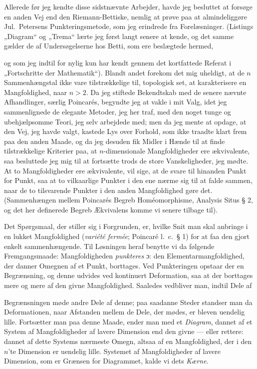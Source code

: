 \documentclass{article}
\begin{document}
Allerede før jeg kendte disse sidstnævnte Arbejder, havde jeg besluttet at forsøge en anden Vej end den Riemann-Bettiske, nemlig at prøve paa at almindeliggøre Jul.~Petersens Punkteringsmetode, som jeg erindrede fra Forelæsninger. (Listings „Diagram“ og „Trema“ lærte jeg først langt senere at kende, og det samme gælder de af Undersøgelserne hos Betti, som ere beslægtede hermed,

og som jeg indtil for nylig kun har kendt gennem det kortfattede Referat i „Fortschritte der Mathematik“). Blandt andet forekom det mig uheldigt, at de $n$ Sammenhængstal ikke vare tilstrækkelige til, topologisk set, at karakterisere en Mangfoldighed, naar $n > 2$. Da jeg stiftede Bekendtskab med de senere nævnte Afhandlinger, særlig Poincarés, begyndte jeg at vakle i mit Valg, idet jeg sammenlignede de elegante Metoder, jeg her traf, med den noget tunge og ubehjælpsomme Teori, jeg selv arbejdede med; men da jeg mente at opdage, at den Vej, jeg havde valgt, kastede Lys over Forhold, som ikke traadte klart frem paa den anden Maade, og da jeg desuden fik Midler i Hænde til at finde tilstrækkelige Kriterier paa, at $n$-dimensionale Mangfoldigheder ere ækvivalente, saa besluttede jeg mig til at fortsætte trods de store Vanskeligheder, jeg mødte. At to Mangfoldigheder ere ækvivalente, vil sige, at de svare til hinanden Punkt for Punkt, saa at to vilkaarlige Punkter i den ene nærme sig til at falde sammen, naar de to tilsvarende Punkter i den anden Mangfoldighed gøre det. (Sammenhængen mellem Poincarés Begreb Homéomorphisme, Analysis Situs § 2, og det her definerede Begreb Ækvivalens komme vi senere tilbage til).

Det Spørgsmaal, der stiller sig i Forgrunden, er, hvilke Snit man skal anbringe i en lukket Mangfoldighed (\emph{variété fermée}; Poincaré l.~c.\ § 1) for at faa den gjort enkelt sammenhængende. Til Løsningen heraf benytte vi da følgende Fremgangsmaade: Mangfoldigheden \emph{punkteres} ɔ: den Elementarmangfoldighed, der danner Omegnen af et Punkt, borttages. Ved Punkteringen opstaar der en Begrænsning, og denne udvides ved kontinuert Deformation, saa at der borttages mere og mere af den givne Mangfoldighed. Saaledes vedbliver man, indtil Dele af

Begrænsningen møde andre Dele af denne; paa saadanne Steder standser man da Deformationen, naar Afstanden mellem de Dele, der mødes, er bleven uendelig lille. Fortsætter man paa denne Maade, ender man med et \emph{Diagram}, dannet af et System af Mangfoldigheder af lavere Dimension end den givne --- eller rettere: dannet af dette Systems nærmeste Omegn, altsaa af en Mangfoldighed, der i den $n$'te Dimension er uendelig lille. Systemet af Mangfoldigheder af lavere Dimension, som er Grænsen for Diagrammet, kalde vi dets \emph{Kærne}.
\end{document}
